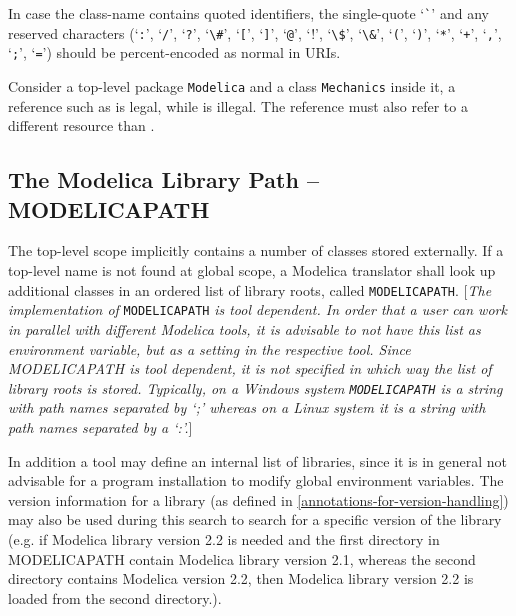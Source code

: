 In case the class-name contains quoted identifiers, the single-quote `\lstinline!`!'
and any reserved characters (`\lstinline!:!', `\lstinline!/!', `\lstinline!?!', `\lstinline!\#!', `\lstinline![!',
`\lstinline!]!', `\lstinline!@!', `\lstinline!!!', `\lstinline!\$!', `\lstinline!\&!', `\lstinline!(!', `\lstinline!)!', `\lstinline!*!', `\lstinline!+!',
`\lstinline!,!', `\lstinline!;!', `\lstinline!=!') should be percent-encoded as normal in URIs.

\begin{example}
Consider a top-level package \lstinline!Modelica! and a class
\lstinline!Mechanics! inside it, a reference such as
 is legal, while
 is illegal. The reference
 must also refer to a different
resource than .
\end{example}

\subsection{The Modelica Library Path -- MODELICAPATH}

The top-level scope implicitly contains a number of classes stored
externally. If a top-level name is not found at global scope, a Modelica
translator shall look up additional classes in an ordered list of
library roots, called \lstinline!MODELICAPATH!. {[}\emph{The implementation of}
\lstinline!MODELICAPATH! \emph{is tool dependent. In order that a user can work in
parallel with different Modelica tools, it is advisable to not have this
list as environment variable, but as a setting in the respective tool.
Since MODELICAPATH is tool dependent, it is not specified in which way
the list of library roots is stored. Typically, on a Windows system
\lstinline!MODELICAPATH! is a string with path names separated by `;' whereas on a
Linux system it is a string with path names separated by a `:'.}{]}

In addition a tool may define an internal list of libraries, since it is
in general not advisable for a program installation to modify global
environment variables. The version information for a library (as defined
in \autoref{annotations-for-version-handling}) may also be used during this search to search for a
specific version of the library (e.g. if Modelica library version 2.2 is
needed and the first directory in MODELICAPATH contain Modelica library
version 2.1, whereas the second directory contains Modelica version 2.2,
then Modelica library version 2.2 is loaded from the second directory.).


